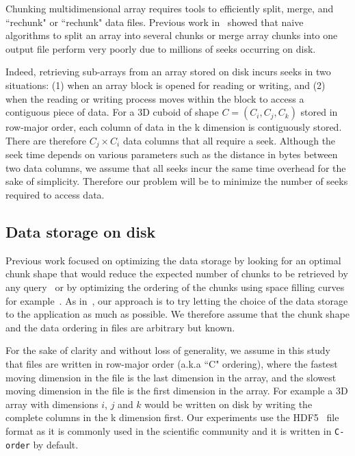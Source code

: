 \documentclass[conference]{IEEEtran}
\begin{document}
Chunking multidimensional array requires tools to efficiently split,
merge, and ``rechunk" or ``rechunk" data files. Previous work in~\cite{seqalgorithms}
showed that naive algorithms to split an array into several chunks or merge
array chunks into one output file perform very poorly due to millions of seeks
occurring on disk.

Indeed, retrieving sub-arrays from an array stored on disk incurs seeks in two situations: (1) when an array block
is opened for reading or writing, and (2) when the reading or writing process
moves within the block to access a contiguous piece of data. For a 3D cuboid of shape $C = (C_i, C_j, C_k)$
 stored in row-major order,
each column of data in the k dimension is contiguously stored. There are therefore
$C_j \times C_i$ data columns that all require a seek. Although the seek
time depends on various parameters such as the distance in bytes between two
data columns, we assume that all seeks incur the same time overhead for the sake
of simplicity. Therefore our problem will be to minimize the number of seeks
required to access data.

\subsection{Data storage on disk}
Previous work focused on optimizing the data storage by looking for an optimal
chunk shape that would reduce the expected number of chunks to be retrieved by
any query~\cite{optimal_chuking} or by optimizing the ordering of the chunks
using space filling curves for example~\cite{optimal_chuking, openconnectomecluster}.
As in~\cite{seqalgorithms}, our approach is to try letting the choice of the
data storage to the application as much as possible. We therefore assume that
the chunk shape and the data ordering in files are arbitrary but known.

For the sake of clarity and without loss of generality,
 we assume in this study that files are written in row-major order (a.k.a
``C" ordering), where the fastest moving dimension in the file is the last
dimension in the array, and the slowest moving dimension in the file is the first
dimension in the array. For example a 3D array with dimensions $i$, $j$ and $k$
would be written on disk by writing the complete columns in the k dimension first.
Our experiments use the HDF5~\cite{hdf5} file format as it is commonly used in the
scientific community and it is written in \texttt{C-order} by default.
\end{document}
